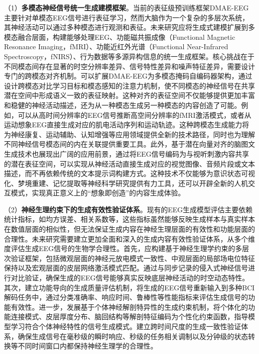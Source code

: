（1）\textbf{多模态神经信号统一生成建模框架}。当前的表征级预训练框架DMAE-EEG主要针对单模态EEG信号进行表征学习，然而大脑作为一个复杂的多层次系统，其神经活动可以通过多种模态进行观测和表征。未来研究应将生成式建模扩展到多模态融合层面，构建能够处理EEG、功能磁共振成像（Functional Magnetic Resonance Imaging，fMRI）、功能近红外光谱（Functional Near-Infrared Spectroscopy，fNIRS）、行为数据等多源异构信息的统一生成框架。核心挑战在于不同模态间存在显著的时空分辨率差异、信号特性差异和噪声特征差异，需要设计专门的跨模态对齐机制。可以扩展DMAE-EEG为多模态掩码自编码器架构，通过设计跨模态对比学习目标和模态感知的注意力机制，使不同模态的神经信号在共享潜在空间中形成语义一致的表征映射。这种对齐的表征空间不仅能够提供更加丰富和稳健的神经活动描述，还为从一种模态生成另一种模态的内容创造了可能。例如，可以从高时间分辨率的EEG信号推断高空间分辨率的fMRI激活模式，或者从运动想象EEG直接生成对应的肌电活动序列和运动轨迹。这种跨模态生成能力将为神经康复、运动辅助、认知增强等应用领域提供全新的技术路径，同时也为理解不同神经信号模态间的内在关联提供重要工具。此外，基于潜在向量对齐的脑图文生成技术也展现出广阔的应用前景，通过将EEG信号编码为与视听刺激内容共享的潜在表征空间，可以实现从神经活动直接生成对应的视觉图像、音频片段或文本描述，而不再依赖传统的文本提示词构建方式。这种技术不仅能够为意识状态可视化、梦境重建、记忆提取等神经科学研究提供有力工具，还可以开辟全新的人机交互模式，实现真正意义上的“想象即创造”的内容生成体验。

（2）\textbf{神经生理约束下的生成有效性验证体系}。现有的EEG生成模型评估主要依赖统计指标，如均方误差、相关系数等，这些指标虽然能够反映生成样本与真实样本在数值层面的相似性，但无法保证生成内容在神经生理层面的有效性和功能层面的合理性。未来研究需要建立更加全面和深入的生成内容有效性验证体系，从多个维度评估生成EEG信号的生物学合理性。首先，应构建基于神经生理学约束的多层次验证框架，包括微观层面的神经元放电模式一致性、中观层面的局部场电位特征保持以及宏观层面的皮层网络激活模式匹配。通过与同步记录的侵入式神经信号进行对比验证，确保生成的EEG信号能够真实反映底层神经活动的时空动态特性。其次，建立功能导向的生成质量评估机制，将生成的EEG信号重新输入到多种BCI解码任务中，通过分类准确率、响应时间、鲁棒性等性能指标来评估生成信号的功能有效性。进一步，发展基于个体神经解剖特异性的生成约束机制，将个体化的功能连接模式、皮层厚度分布、脑回结构等解剖特征编码为个性化约束函数，指导模型学习符合个体神经特性的信号生成模式。建立跨时间尺度的生成一致性验证体系，确保生成信号在毫秒级的瞬时响应、秒级的任务相关调制以及分钟级的状态转换等不同时间窗口内都保持神经生理学的合理性。

